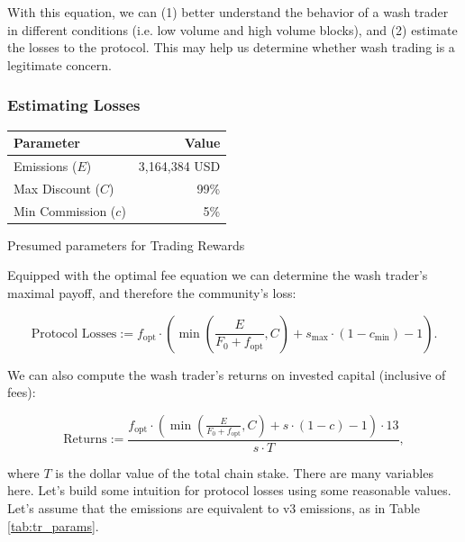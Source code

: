     With this equation, we can (1) better understand the behavior of a wash trader in different conditions (i.e. low volume and high volume blocks), and (2) estimate the losses to the protocol. This may help us determine whether wash trading is a legitimate concern.
    
    \subsubsection{Estimating Losses}

        \begin{margintable}
            \centering
            \begin{tabular}{l r}
                \toprule
                Parameter & Value \\
                \midrule
                Emissions ($E$) & 3,164,384 USD \\
                Max Discount ($C$) & 99\% \\
                Min Commission ($c$) & 5\% \\
                \bottomrule
            \end{tabular}
            \caption{Presumed parameters for Trading Rewards}
            \label{tab:tr_params}
        \end{margintable}

        Equipped with the optimal fee equation we can determine the wash trader’s maximal payoff, and therefore the community’s loss:
        
        \begin{equation}
            \text{Protocol Losses} := f_{\text{opt}} \cdot \left(\min{\left(\frac{E}{F_0 + f_{\text{opt}}}, C\right)} + s_{\text{max}}\cdot(1-c_{\text{min}}) - 1\right).
        \end{equation}

        We can also compute the wash trader's returns on invested capital (inclusive of fees):

        \begin{equation}
            \text{Returns} := \frac{f_{\text{opt}} \cdot \left(\min{\left(\frac{E}{F_0 + f_{\text{opt}}}, C\right)} + s \cdot (1-c) - 1\right) \cdot 13}{s \cdot T},
        \end{equation}
        
        where $T$ is the dollar value of the total chain stake. There are many variables here. Let’s build some intuition for protocol losses using some reasonable values. Let’s assume that the emissions are equivalent to v3 emissions, as in Table \ref{tab:tr_params}.

